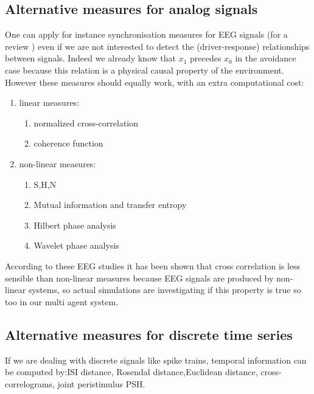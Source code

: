 \subsection{Alternative measures for analog signals}
One can apply for instance synchronisation measures for EEG signals
(for a review \citep{PhysRevE.65.041903}) even if we are not interested to
detect the (driver-response) relationships between signals. Indeed we already know
that $x_{1}$ precedes $x_{0}$ in the avoidance case because this relation is a
physical causal property of the environment. However these measures should
equally work, with an extra computational cost:
\begin{enumerate}
\item linear measures:
\begin{enumerate}
\item normalized cross-correlation
\item coherence function
\end{enumerate}
\item non-linear measures:
\begin{enumerate}
\item S,H,N
\item Mutual information and transfer entropy
\item Hilbert phase analysis
\item Wavelet phase analysis
\end{enumerate}
\end{enumerate}

According to these EEG studies it has been shown that cross correlation is less
 sensible than non-linear measures because EEG signals are produced by
non-linear systems, so actual simulations are investigating if this property
 is true so too in our multi agent system.

\subsection{Alternative measures for discrete time series}
If we are dealing with discrete signals like spike trains, temporal information
can be computed by:ISI distance, Rosendal distance,Euclidean distance,
cross-correlograms, joint peristimulus PSH.
